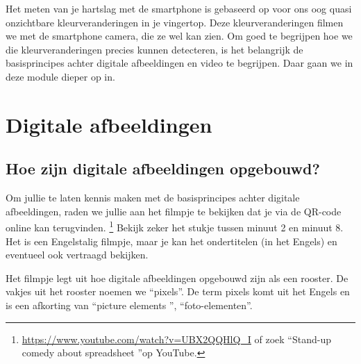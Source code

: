 \label{sec:digafbvid}

\begin{samenvatting}
Het meten van je hartslag met de smartphone is gebaseerd op voor ons oog quasi onzichtbare kleurveranderingen in je vingertop. Deze kleurveranderingen filmen we met de smartphone camera, die ze wel kan zien. Om goed te begrijpen hoe we die kleurveranderingen precies kunnen detecteren, is het belangrijk de basisprincipes achter digitale afbeeldingen en video te begrijpen. Daar gaan we in deze module dieper op in.
\end{samenvatting}
%

\section{Digitale afbeeldingen}
\label{sec:Mod3_Sec1}
%

\subsection{Hoe zijn digitale afbeeldingen opgebouwd?}

Om jullie te laten kennis maken met de basisprincipes achter digitale afbeeldingen, raden we jullie aan het filmpje te bekijken dat je via de QR-code online kan terugvinden. \footnote{\url{https://www.youtube.com/watch?v=UBX2QQHlQ_I} of zoek \textquotedblleft Stand-up comedy about spreadsheet \textquotedblright op YouTube.} Bekijk zeker het stukje tussen minuut 2 en minuut 8. Het is een Engelstalig filmpje, maar je kan het ondertitelen (in het Engels) en eventueel ook vertraagd bekijken. 


Het filmpje legt uit hoe digitale afbeeldingen opgebouwd zijn als een rooster. De vakjes uit het rooster noemen we \textquotedblleft pixels\textquotedblright. De term pixels komt uit het Engels en is een afkorting van \textquotedblleft picture elements \textquotedblright, \textquotedblleft foto-elementen\textquotedblright.

